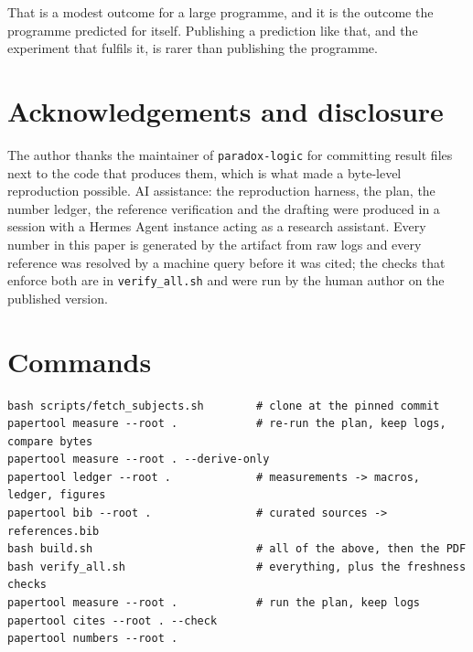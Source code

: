 \documentclass[11pt,a4paper]{article}
\begin{document}
That is a modest outcome for a large programme, and it is the outcome the programme predicted for
itself. Publishing a prediction like that, and the experiment that fulfils it, is rarer than
publishing the programme.

\section*{Acknowledgements and disclosure}

The author thanks the maintainer of \texttt{paradox-logic} for committing result files next to the
code that produces them, which is what made a byte-level reproduction possible. AI assistance: the
reproduction harness, the plan, the number ledger, the reference verification and the drafting were
produced in a session with a Hermes Agent instance acting as a research assistant. Every number in
this paper is generated by the artifact from raw logs and every reference was resolved by a machine
query before it was cited; the checks that enforce both are in \texttt{verify\_\allowbreak{}all.sh} and were run
by the human author on the published version.




\appendix
\section{Commands}

\begin{verbatim}
bash scripts/fetch_subjects.sh        # clone at the pinned commit
papertool measure --root .            # re-run the plan, keep logs, compare bytes
papertool measure --root . --derive-only
papertool ledger --root .             # measurements -> macros, ledger, figures
papertool bib --root .                # curated sources -> references.bib
bash build.sh                         # all of the above, then the PDF
bash verify_all.sh                    # everything, plus the freshness checks
papertool measure --root .            # run the plan, keep logs
papertool cites --root . --check
papertool numbers --root .
\end{verbatim}
\end{document}
